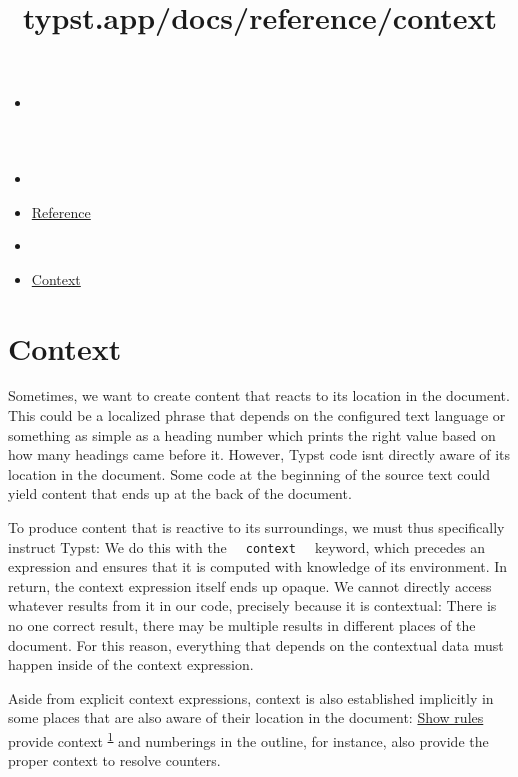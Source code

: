 \title{typst.app/docs/reference/context}

\begin{itemize}
\tightlist
\item
  \href{/docs}{}
\item
  
\item
  \href{/docs/reference/}{Reference}
\item
  
\item
  \href{/docs/reference/context/}{Context}
\end{itemize}

\section{Context}\label{context}

Sometimes, we want to create content that reacts to its location in the
document. This could be a localized phrase that depends on the
configured text language or something as simple as a heading number
which prints the right value based on how many headings came before it.
However, Typst code isn\textquotesingle t directly aware of its location
in the document. Some code at the beginning of the source text could
yield content that ends up at the back of the document.

To produce content that is reactive to its surroundings, we must thus
specifically instruct Typst: We do this with the
\texttt{\ }{\texttt{\ context\ }}\texttt{\ } keyword, which precedes an
expression and ensures that it is computed with knowledge of its
environment. In return, the context expression itself ends up opaque. We
cannot directly access whatever results from it in our code, precisely
because it is contextual: There is no one correct result, there may be
multiple results in different places of the document. For this reason,
everything that depends on the contextual data must happen inside of the
context expression.

Aside from explicit context expressions, context is also established
implicitly in some places that are also aware of their location in the
document: \href{/docs/reference/styling/\#show-rules}{Show rules}
provide context \textsuperscript{\hyperref[1]{1}} and numberings in the
outline, for instance, also provide the proper context to resolve
counters.

